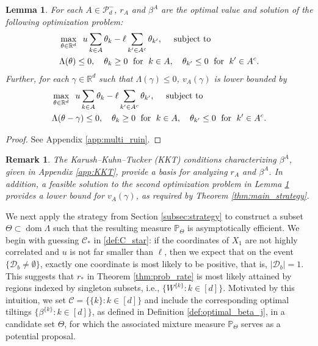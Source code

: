 \documentclass[aap,preprint]{imsart}
\newcommand{\Pro}{{\mathbb{P}}}
\newcommand{\bR}{{\mathbb{R}}}
\theoremstyle{plain}
\newtheorem{lemma}[theorem]{Lemma}
\newtheorem{remark}{Remark}[section]
\theoremstyle{definition}
\begin{document}
\begin{lemma}\label{lemma:opt_probs}
For each $A \in \mathcal{P}_d^{-}$, $r_A$ and $\beta^A$ are the optimal value and solution of the following optimization problem:
\begin{align*}
& \max_{\theta \in \bR^d} \;\;  u \sum_{k \in A} \theta_k -  \ell \sum_{k' \in A^c} \theta_{k'}, \quad \textup{ subject to }  \\
& \Lambda(\theta) \leq 0, \quad \theta_k \geq 0\; \text{ for } \;k \in A, \quad \theta_{k'} \leq 0\; \text{ for } \;k' \in A^c.
\end{align*}
Further, for each $\gamma \in \bR^d$ such that $\Lambda(\gamma) \leq 0$, $v_A(\gamma)$ is lower bounded by
\begin{align*}
& \max_{\theta \in \bR^d} \;\;  u \sum_{k \in A} \theta_k -  \ell \sum_{k' \in A^c} \theta_{k'}, \quad \textup{ subject to }  \\
& \Lambda(\theta - \gamma) \leq 0, \quad \theta_k \geq 0\; \text{ for } \;k \in A, \quad \theta_{k'} \leq 0\; \text{ for } \;k' \in A^c.
\end{align*}
\end{lemma}
\begin{proof}
    See Appendix \ref{app:multi_ruin}.
\end{proof}


\begin{remark}
The Karush–Kuhn–Tucker (KKT) conditions characterizing $\beta^A$, given in Appendix \ref{app:KKT}, provide a basis for analyzing $r_A$ and $\beta^A$. In addition,
a \textit{feasible} solution to the second optimization problem in Lemma \ref{lemma:opt_probs} provides a lower bound for $v_A(\gamma)$, 
as required by Theorem \ref{thm:main_strategy}.
\end{remark}

We next apply the strategy from Section \ref{subsec:strategy} to construct a subset $\Theta \subset \operatorname{dom} \Lambda$ such that the resulting measure $\Pro_{\Theta}$ is asymptotically efficient. We begin with guessing $\mathcal{C}_*$ in \eqref{def:C_star}: if the coordinates of $X_1$ are not highly correlated and $u$ is not far smaller than $\ell$, then we expect that on the event $\{\mathcal{D}_{b} \neq \emptyset\}$, exactly one coordinate is most likely to be positive, that is,  $|\mathcal{D}_{b}| = 1$. This suggests that $r_*$ in Theorem \ref{thm:prob_rate} is most likely attained by regions indexed by singleton subsets, i.e., $\{W^{\{k\}} : k \in [d]\}$. Motivated by this intuition, we set $\mathcal{C} = \{\{k\} : k \in [d]\}$ and include the corresponding optimal tiltings $\{\beta^{\{k\}} : k \in [d]\}$, as defined in Definition \ref{def:optimal_beta_j}, in a candidate set $\Theta$, for which the associated mixture measure $\Pro_{\Theta}$ serves as a potential proposal.
\end{document}
